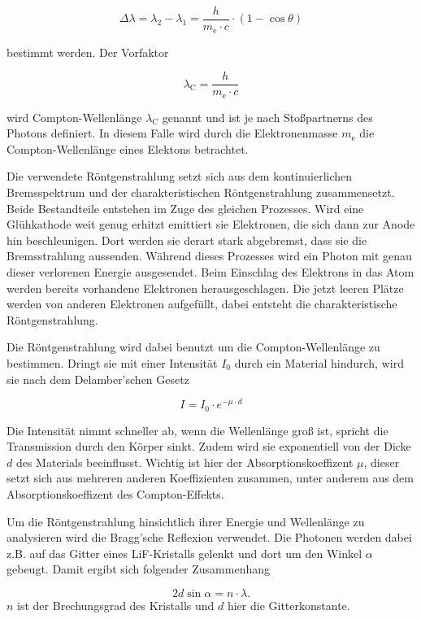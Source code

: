 \begin{equation}
\Delta \lambda = \lambda _2 - \lambda _1 = \frac{h}{m_\text{e} \cdot c} \cdot \left(1 - \cos{\theta}\right)
    \label{eq:deltalambda}
\end{equation}

bestimmt werden.
Der Vorfaktor  

\begin{equation}
    \lambda _\text{C} = \frac{h}{m_\text{e} \cdot c}
    \label{eq:compton}
\end{equation}

wird Compton-Wellenlänge $\lambda _\text{C}$ genannt und ist je nach Stoßpartnerns des Photons definiert.
In diesem Falle wird durch die Elektronenmasse $m_\text{e}$ die Compton-Wellenlänge eines Elektons betrachtet.

Die verwendete Röntgenstrahlung setzt sich aus dem kontinuierlichen Bremsspektrum und der charakteristischen Röntgenstrahlung zusammensetzt.
Beide Bestandteile entstehen im Zuge des gleichen Prozesses.
Wird eine Glühkathode weit genug erhitzt emittiert sie Elektronen, die sich dann zur Anode hin beschleunigen.
Dort werden sie derart stark abgebremst, dass sie die Bremsstrahlung aussenden. 
Während dieses Prozesses wird ein Photon mit genau dieser verlorenen Energie ausgesendet.
Beim Einschlag des Elektrons in das Atom werden bereits vorhandene Elektronen herausgeschlagen.
Die jetzt leeren Plätze werden von anderen Elektronen aufgefüllt, dabei entsteht die charakteristische Röntgenstrahlung.

Die Röntgenstrahlung wird dabei benutzt um die Compton-Wellenlänge zu bestimmen.
Dringt sie mit einer Intensität $I_0$ durch ein Material hindurch, wird sie nach dem Delamber'schen Gesetz 

\begin{equation}
    I = I_0 \cdot e^{- \mu \cdot d}
    \label{eq:delamber}
\end{equation}

Die Intensität nimmt schneller ab, wenn die Wellenlänge groß ist, spricht die Transmission durch den Körper sinkt.
Zudem wird sie exponentiell von der Dicke $d$ des Materials beeinflusst.
Wichtig ist hier der Absorptionskoeffizent $\mu$, dieser setzt sich aus mehreren anderen Koeffizienten zusammen, unter anderem aus dem Absorptionskoeffizent des Compton-Effekts.

Um die Röntgenstrahlung hinsichtlich ihrer Energie und Wellenlänge zu analysieren wird die Bragg'sche Reflexion verwendet.
Die Photonen werden dabei z.B. auf das Gitter eines LiF-Kristalls gelenkt und dort um den Winkel $\alpha$ gebeugt.
Damit ergibt sich folgender Zusammenhang

\begin{equation}
    2 d \sin{\alpha} = n \cdot \lambda.
    \label{eq:bragg}
\end{equation}
$n$ ist der Brechungsgrad des Kristalls und $d$ hier die Gitterkonstante.
